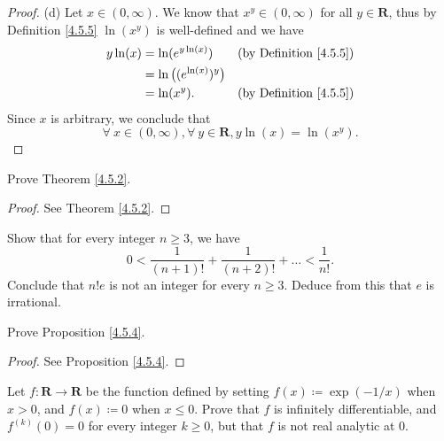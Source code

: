 \begin{proof}{(d)}
    Let \(x \in (0, \infty)\).
    We know that \(x^y \in (0, \infty)\) for all \(y \in \mathbf{R}\), thus by Definition \ref{4.5.5} \(\ln(x^y)\) is well-defined and we have
    \begin{align*}
        y \ln(x) & = \ln(e^{y \ln(x)})             & \text{(by Definition \ref{4.5.5})} \\
                 & = \ln\big((e^{\ln(x)})^{y}\big)                                      \\
                 & = \ln(x^y).                     & \text{(by Definition \ref{4.5.5})}
    \end{align*}
    Since \(x\) is arbitrary, we conclude that
    \[
        \forall\ x \in (0, \infty), \forall\ y \in \mathbf{R}, y \ln(x) = \ln(x^y).
    \]
\end{proof}

\exercisesection

\begin{exercise}\label{ex 4.5.1}
    Prove Theorem \ref{4.5.2}.
\end{exercise}

\begin{proof}
    See Theorem \ref{4.5.2}.
\end{proof}

\begin{exercise}\label{ex 4.5.2}
    Show that for every integer \(n \geq 3\), we have
    \[
        0 < \frac{1}{(n + 1)!} + \frac{1}{(n + 2)!} + \dots < \frac{1}{n!}.
    \]
    Conclude that \(n! e\) is not an integer for every \(n \geq 3\).
    Deduce from this that \(e\) is irrational.
\end{exercise}

\begin{exercise}\label{ex 4.5.3}
    Prove Proposition \ref{4.5.4}.
\end{exercise}

\begin{proof}
    See Proposition \ref{4.5.4}.
\end{proof}

\begin{exercise}\label{ex 4.5.4}
    Let \(f : \mathbf{R} \to \mathbf{R}\) be the function defined by setting \(f(x) \coloneqq \exp(-1 / x)\) when \(x > 0\), and \(f(x) \coloneqq 0\) when \(x \leq 0\).
    Prove that \(f\) is infinitely differentiable, and \(f^{(k)}(0) = 0\) for every integer \(k \geq 0\), but that \(f\) is not real analytic at \(0\).
\end{exercise}

